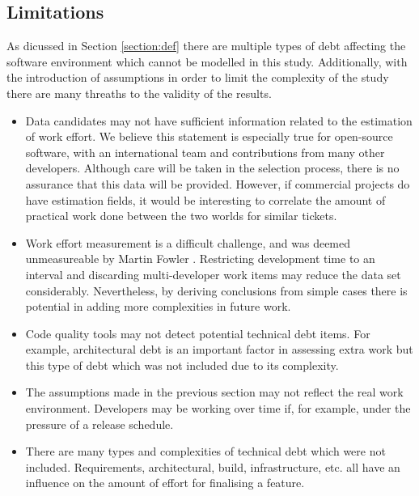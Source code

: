 \documentclass{mprop}
\begin{document}
\subsection{Limitations}

As dicussed in Section \ref{section:def} there are multiple types of debt
affecting the software environment which cannot be modelled in this study.
Additionally, with the introduction of assumptions in order to limit the
complexity of the study there are many threaths to the validity of the results.

\begin{itemize}
	\item Data candidates may not have sufficient information related to the
	      estimation of work effort. We believe this statement is especially true for
	      open-source software, with an international team and contributions from many
	      other developers. Although care will be taken in the selection process,
	      there is no assurance that this data will be provided. However, if
	      commercial projects do have estimation fields, it would be interesting to
	      correlate the amount of practical work done between the two worlds for
	      similar tickets.
	\item Work effort measurement is a difficult challenge, and was deemed
	      unmeasureable by Martin Fowler \cite{CannotMeasureProductivity}. Restricting
	      development time to an interval and discarding multi-developer work items
	      may reduce the data set considerably. Nevertheless, by deriving conclusions
	      from simple cases there is potential in adding more complexities in future work.
	\item Code quality tools may not detect potential technical debt items. For
	      example, architectural debt is an important factor in assessing extra work but
	      this type of debt which was not included due to its complexity.
	\item The assumptions made in the previous section may not reflect the real
	      work environment. Developers may be working over time if, for example, under
	      the pressure of a release schedule.
	\item There are many types and complexities of technical debt which were not
	      included. Requirements, architectural, build, infrastructure, etc. all have
	      an influence on the amount of effort for finalising a feature.
\end{itemize}

\end{document}
